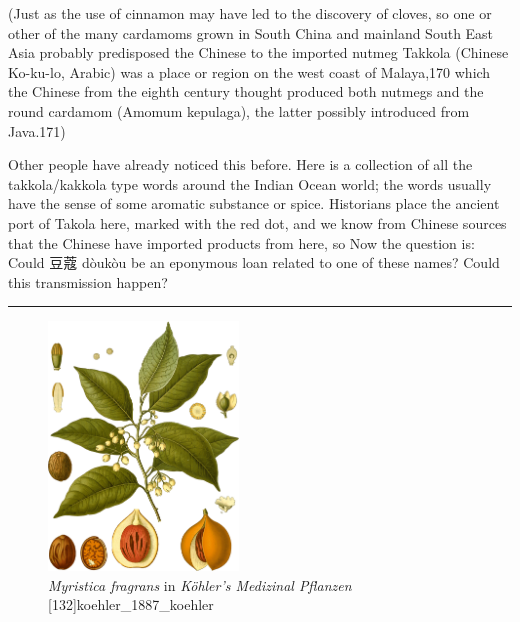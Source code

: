 \documentclass[12pt]{article}
\begin{document}
(Just as the use of cinnamon may have led to the discovery of cloves, so one or other of the many cardamoms grown in South China and mainland South East Asia probably predisposed the Chinese to the imported nutmeg Takkola (Chinese Ko-ku-lo, Arabic) was a place or region on the west coast of Malaya,170 which the Chinese from the eighth century thought produced both nutmegs and the round cardamom (Amomum kepulaga), the latter possibly introduced from Java.171)



Other people have already noticed this before. Here is a collection of all the takkola/kakkola type words around the Indian Ocean world; the words usually have the sense of some aromatic substance or spice. 
Historians place the ancient port of Takola here, marked with the red dot, and we know from Chinese sources that the Chinese have imported products from here, so
Now the question is: Could 豆蔻 dòukòu be an eponymous loan related to one of these names? Could this transmission happen?






\noindent\rule{\textwidth}{0.5pt}


\begin{figure}[h]
    \centering
    \includegraphics[width=0.45\textwidth]{imgs/nutmeg.png}
    \caption{\textit{Myristica fragrans} in \textit{Köhler's Medizinal Pflanzen} [132]{koehler_1887_koehler}}
    \label{fig:nutmeg}
\end{figure}



\printbibliography
\end{document}
